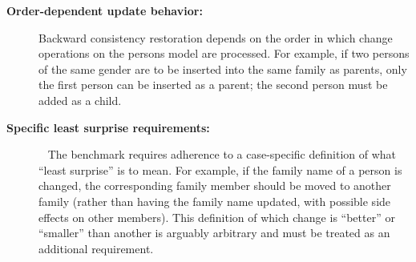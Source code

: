\begin{description}
	\item[\textbf{Order-dependent update behavior:}] 
	Backward consistency restoration depends on the order in which change operations on the persons model are processed. 
	For example, if two persons of the same gender are to be inserted into the same family as parents, only the first person can be inserted as a parent; the second person must be added as a child.
	
	\item[\textbf{Specific least surprise requirements:}]~
	The bench\-mark requires adherence to a case-specific definition of what ``least surprise'' is to mean.
	For example, if the family name of a person is changed, the corresponding family member should be moved to another family (rather than having the family name updated, with possible side effects on other members).
	This definition of which change is ``better'' or ``smaller'' than another is arguably arbitrary and must be treated as an additional requirement.
\end{description}
